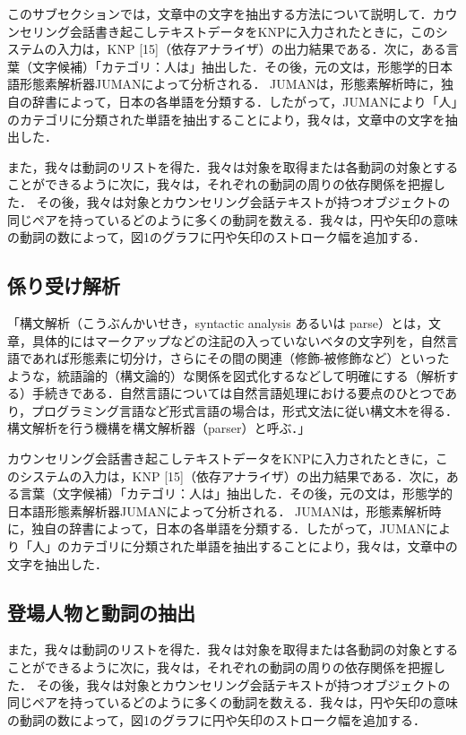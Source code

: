 \documentclass[shuuron]{kuee}
\begin{document}
  このサブセクションでは，文章中の文字を抽出する方法について説明して．カウンセリング会話書き起こしテキストデータをKNPに入力されたときに，このシステムの入力は，KNP [15]（依存アナライザ）の出力結果である．次に，ある言葉（文字候補）「カテゴリ：人は」抽出した．その後，元の文は，形態学的日本語形態素解析器JUMAN\cite{juman}によって分析される． JUMANは，形態素解析時に，独自の辞書によって，日本の各単語を分類する．したがって，JUMANにより「人」のカテゴリに分類された単語を抽出することにより，我々は，文章中の文字を抽出した．

  また，我々は動詞のリストを得た．我々は対象を取得または各動詞の対象とすることができるように次に，我々は，それぞれの動詞の周りの依存関係を把握した．
  その後，我々は対象とカウンセリング会話テキストが持つオブジェクトの同じペアを持っているどのように多くの動詞を数える．我々は，円や矢印の意味の動詞の数によって，図1のグラフに円や矢印のストローク幅を追加する．


  \subsection{係り受け解析}


「構文解析（こうぶんかいせき，syntactic analysis あるいは parse）とは，文章，具体的にはマークアップなどの注記の入っていないベタの文字列を，自然言語であれば形態素に切分け，さらにその間の関連（修飾-被修飾など）といったような，統語論的（構文論的）な関係を図式化するなどして明確にする（解析する）手続きである．自然言語については自然言語処理における要点のひとつであり，プログラミング言語など形式言語の場合は，形式文法に従い構文木を得る．構文解析を行う機構を構文解析器（parser）と呼ぶ．」

カウンセリング会話書き起こしテキストデータをKNPに入力されたときに，このシステムの入力は，KNP [15]（依存アナライザ）の出力結果である．次に，ある言葉（文字候補）「カテゴリ：人は」抽出した．その後，元の文は，形態学的日本語形態素解析器JUMAN\cite{juman}によって分析される． JUMANは，形態素解析時に，独自の辞書によって，日本の各単語を分類する．したがって，JUMANにより「人」のカテゴリに分類された単語を抽出することにより，我々は，文章中の文字を抽出した．


  \subsection{登場人物と動詞の抽出}

  また，我々は動詞のリストを得た．我々は対象を取得または各動詞の対象とすることができるように次に，我々は，それぞれの動詞の周りの依存関係を把握した．
  その後，我々は対象とカウンセリング会話テキストが持つオブジェクトの同じペアを持っているどのように多くの動詞を数える．我々は，円や矢印の意味の動詞の数によって，図1のグラフに円や矢印のストローク幅を追加する．
\end{document}
